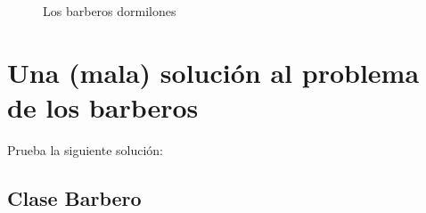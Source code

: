 \documentclass[letterpaper,10pt,spanish]{sphinxmanual}
\begin{document}
\begin{figure}[htbp]
\centering
\capstart

\noindent{}
\caption{Los  barberos dormilones}\label{\detokenize{textos/tema2:id4}}\end{figure}


\section{Una (mala) solución al problema de los barberos}
\label{\detokenize{textos/tema2:una-mala-solucion-al-problema-de-los-barberos}}
Prueba la siguiente solución:


\subsection{Clase Barbero}
\label{\detokenize{textos/tema2:clase-barbero}}
%
\end{document}
